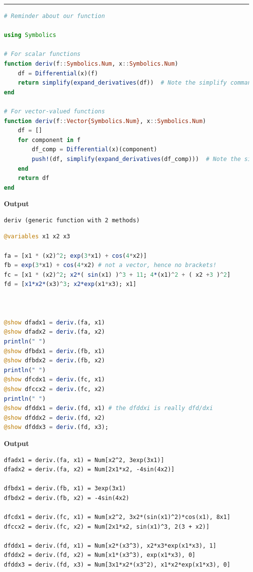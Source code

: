 \rule{\linewidth}{2.0pt}
\begin{lstlisting}[language=Julia,style=mystyle]
# Reminder about our function 

using Symbolics

# For scalar functions
function deriv(f::Symbolics.Num, x::Symbolics.Num)
    df = Differential(x)(f)
    return simplify(expand_derivatives(df))  # Note the simplify command
end

# For vector-valued functions
function deriv(f::Vector{Symbolics.Num}, x::Symbolics.Num)
    df = []
    for component in f
        df_comp = Differential(x)(component)
        push!(df, simplify(expand_derivatives(df_comp)))  # Note the simplify command
    end
    return df
end
\end{lstlisting}
\textbf{Output} 
\begin{verbatim}
deriv (generic function with 2 methods)
\end{verbatim}

\begin{lstlisting}[language=Julia,style=mystyle]
@variables x1 x2 x3

fa = [x1 * (x2)^2; exp(3*x1) + cos(4*x2)]
fb = exp(3*x1) + cos(4*x2) # not a vector, hence no brackets!
fc = [x1 * (x2)^2; x2*( sin(x1) )^3 + 11; 4*(x1)^2 + ( x2 +3 )^2]
fd = [x1*x2*(x3)^3; x2*exp(x1*x3); x1]



@show dfadx1 = deriv.(fa, x1)
@show dfadx2 = deriv.(fa, x2)
println(" ")
@show dfbdx1 = deriv.(fb, x1)
@show dfbdx2 = deriv.(fb, x2)
println(" ")
@show dfcdx1 = deriv.(fc, x1)
@show dfccx2 = deriv.(fc, x2)
println(" ")
@show dfddx1 = deriv.(fd, x1) # the dfddxi is really dfd/dxi
@show dfddx2 = deriv.(fd, x2)
@show dfddx3 = deriv.(fd, x3);
\end{lstlisting}
\textbf{Output} 
\begin{verbatim}
dfadx1 = deriv.(fa, x1) = Num[x2^2, 3exp(3x1)]
dfadx2 = deriv.(fa, x2) = Num[2x1*x2, -4sin(4x2)]
 
dfbdx1 = deriv.(fb, x1) = 3exp(3x1)
dfbdx2 = deriv.(fb, x2) = -4sin(4x2)
 
dfcdx1 = deriv.(fc, x1) = Num[x2^2, 3x2*(sin(x1)^2)*cos(x1), 8x1]
dfccx2 = deriv.(fc, x2) = Num[2x1*x2, sin(x1)^3, 2(3 + x2)]
 
dfddx1 = deriv.(fd, x1) = Num[x2*(x3^3), x2*x3*exp(x1*x3), 1]
dfddx2 = deriv.(fd, x2) = Num[x1*(x3^3), exp(x1*x3), 0]
dfddx3 = deriv.(fd, x3) = Num[3x1*x2*(x3^2), x1*x2*exp(x1*x3), 0]
\end{verbatim}
\Qed

